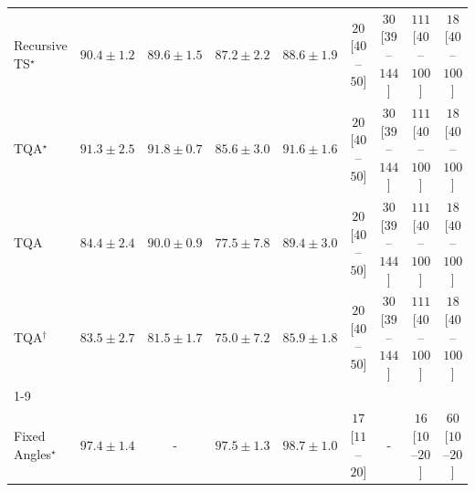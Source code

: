\begin{tabular}{l|cccc|cccc|}
Recursive TS$^\star$ & {\cellcolor[HTML]{2F934D}} \color[HTML]{F1F1F1} $90.4\pm 1.2$ & {\cellcolor[HTML]{359C53}} \color[HTML]{F1F1F1} $89.6\pm 1.5$ & {\cellcolor[HTML]{51B365}} \color[HTML]{F1F1F1} $87.2\pm 2.2$ & {\cellcolor[HTML]{3EA75A}} \color[HTML]{F1F1F1} $88.6\pm 1.9$ & {\cellcolor[HTML]{FDE4E1}} \color[HTML]{000000} $20$ [$40$--$50$] & {\cellcolor[HTML]{FDD9D6}} \color[HTML]{000000} $30$ [$39$--$144$] & {\cellcolor[HTML]{E23E99}} \color[HTML]{F1F1F1} $111$ [$40$--$100$] & {\cellcolor[HTML]{FEE6E3}} \color[HTML]{000000} $18$ [$40$--$100$] \\
TQA$^\star$ & {\cellcolor[HTML]{268846}} \color[HTML]{F1F1F1} $91.3\pm 2.5$ & {\cellcolor[HTML]{228343}} \color[HTML]{F1F1F1} $91.8\pm 0.7$ & {\cellcolor[HTML]{6BC072}} \color[HTML]{000000} $85.6\pm 3.0$ & {\cellcolor[HTML]{248644}} \color[HTML]{F1F1F1} $91.6\pm 1.6$ & {\cellcolor[HTML]{FDE4E1}} \color[HTML]{000000} $20$ [$40$--$50$] & {\cellcolor[HTML]{FDD9D6}} \color[HTML]{000000} $30$ [$39$--$144$] & {\cellcolor[HTML]{E23E99}} \color[HTML]{F1F1F1} $111$ [$40$--$100$] & {\cellcolor[HTML]{FEE6E3}} \color[HTML]{000000} $18$ [$40$--$100$] \\
TQA & {\cellcolor[HTML]{7EC97B}} \color[HTML]{000000} $84.4\pm 2.4$ & {\cellcolor[HTML]{31974F}} \color[HTML]{F1F1F1} $90.0\pm 0.9$ & {\cellcolor[HTML]{DCF1A5}} \color[HTML]{000000} $77.5\pm 7.8$ & {\cellcolor[HTML]{379E54}} \color[HTML]{F1F1F1} $89.4\pm 3.0$ & {\cellcolor[HTML]{FDE4E1}} \color[HTML]{000000} $20$ [$40$--$50$] & {\cellcolor[HTML]{FDD9D6}} \color[HTML]{000000} $30$ [$39$--$144$] & {\cellcolor[HTML]{E23E99}} \color[HTML]{F1F1F1} $111$ [$40$--$100$] & {\cellcolor[HTML]{FEE6E3}} \color[HTML]{000000} $18$ [$40$--$100$] \\
TQA$^\dagger$ & {\cellcolor[HTML]{8BCE81}} \color[HTML]{000000} $83.5\pm 2.7$ & {\cellcolor[HTML]{A9DB8C}} \color[HTML]{000000} $81.5\pm 1.7$ & {\cellcolor[HTML]{F1FAB5}} \color[HTML]{000000} $75.0\pm 7.2$ & {\cellcolor[HTML]{66BD70}} \color[HTML]{F1F1F1} $85.9\pm 1.8$ & {\cellcolor[HTML]{FDE4E1}} \color[HTML]{000000} $20$ [$40$--$50$] & {\cellcolor[HTML]{FDD9D6}} \color[HTML]{000000} $30$ [$39$--$144$] & {\cellcolor[HTML]{E23E99}} \color[HTML]{F1F1F1} $111$ [$40$--$100$] & {\cellcolor[HTML]{FEE6E3}} \color[HTML]{000000} $18$ [$40$--$100$] \\
\cline{1-9}
\multicolumn{9}{c}{\rule{0pt}{8pt}SV} \\
\midrule
Fixed Angles$^\star$ & {\cellcolor[HTML]{03446A}} \color[HTML]{F1F1F1} $97.4\pm 1.4$ & {\cellcolor[HTML]{000000}} \color[HTML]{F1F1F1} {\cellcolor{white}} \color{black} - & {\cellcolor[HTML]{03446A}} \color[HTML]{F1F1F1} $97.5\pm 1.3$ & {\cellcolor[HTML]{023858}} \color[HTML]{F1F1F1} $98.7\pm 1.0$ & {\cellcolor[HTML]{FEE7E4}} \color[HTML]{000000} $17$ [$11$--$20$] & {\cellcolor[HTML]{000000}} \color[HTML]{F1F1F1} {\cellcolor{white}} \color{black} - & {\cellcolor[HTML]{FEE9E5}} \color[HTML]{000000} $16$ [$10$--$20$] & {\cellcolor[HTML]{FBAFBA}} \color[HTML]{000000} $60$ [$10$--$20$] \\

\end{tabular}
